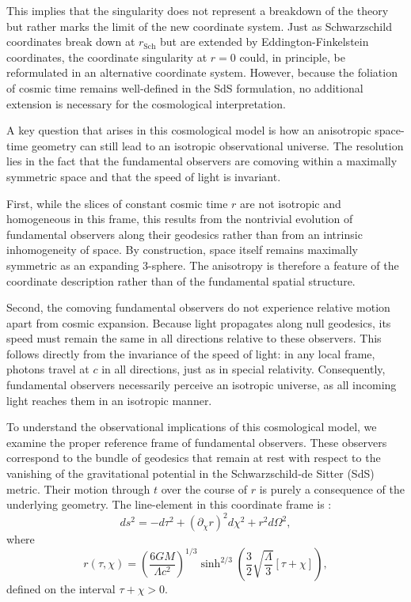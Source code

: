 \documentclass[aps,prd,reprint,superscriptaddress]{revtex4-2}
\begin{document}
This implies that the singularity does not represent a breakdown of the theory but rather marks the limit of the new coordinate system. Just as Schwarzschild coordinates break down at $r_{\mathrm{Sch}}$ but are extended by Eddington-Finkelstein coordinates, the coordinate singularity at $r=0$ could, in principle, be reformulated in an alternative coordinate system. However, because the foliation of cosmic time remains well-defined in the SdS formulation, no additional extension is necessary for the cosmological interpretation.

A key question that arises in this cosmological model is how an anisotropic space-time geometry can still lead to an isotropic observational universe. The resolution lies in the fact that the fundamental observers are comoving within a maximally symmetric space and that the speed of light is invariant.

First, while the slices of constant cosmic time $r$ are not isotropic and homogeneous in this frame, this results from the nontrivial evolution of fundamental observers along their geodesics rather than from an intrinsic inhomogeneity of space. By construction, space itself remains maximally symmetric as an expanding 3-sphere. The anisotropy is therefore a feature of the coordinate description rather than of the fundamental spatial structure.

Second, the comoving fundamental observers do not experience relative motion apart from cosmic expansion. Because light propagates along null geodesics, its speed must remain the same in all directions relative to these observers. This follows directly from the invariance of the speed of light: in any local frame, photons travel at $c$ in all directions, just as in special relativity. Consequently, fundamental observers necessarily perceive an isotropic universe, as all incoming light reaches them in an isotropic manner.

To understand the observational implications of this cosmological model, we examine the proper reference frame of fundamental observers. These observers correspond to the bundle of geodesics that remain at rest with respect to the vanishing of the gravitational potential in the Schwarzschild-de Sitter (SdS) metric. Their motion through $t$ over the course of $r$ is purely a consequence of the underlying geometry. The line-element in this coordinate frame is \cite{Janzen2015}:
\begin{equation}
    ds^2=-d\tau^2+(\partial_{\chi}r)^2d\chi^2+r^2d\Omega^2,\label{eq:SdS_flat}
\end{equation}
where
\begin{equation}
    r(\tau,\chi)=\left(\frac{6GM}{\Lambda c^2}\right)^{1/3}\sinh^{2/3}\left(\frac{3}{2}\sqrt{\frac{\Lambda}{3}}[\tau+\chi]\right),\label{eq:r_SdS}
\end{equation}
defined on the interval $\tau+\chi>0$.
\end{document}
